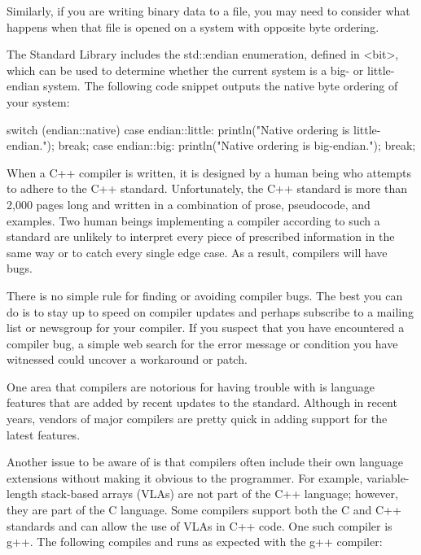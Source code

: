 Similarly, if you are writing binary data to a file, you may need to consider what happens when that file is opened on a system with opposite byte ordering.

The Standard Library includes the std::endian enumeration, defined in <bit>, which can be used to determine whether the current system is a big- or little-endian system. The following code snippet outputs the native byte ordering of your system:

\begin{cpp}
switch (endian::native)
{
    case endian::little:
        println("Native ordering is little-endian.");
        break;
    case endian::big:
        println("Native ordering is big-endian.");
        break;
}
\end{cpp}


When a C++ compiler is written, it is designed by a human being who attempts to adhere to the C++ standard. Unfortunately, the C++ standard is more than 2,000 pages long and written in a combination of prose, pseudocode, and examples. Two human beings implementing a compiler according to such a standard are unlikely to interpret every piece of prescribed information in the same way or to catch every single edge case. As a result, compilers will have bugs.


There is no simple rule for finding or avoiding compiler bugs. The best you can do is to stay up to speed on compiler updates and perhaps subscribe to a mailing list or newsgroup for your compiler. If you suspect that you have encountered a compiler bug, a simple web search for the error message or condition you have witnessed could uncover a workaround or patch.

One area that compilers are notorious for having trouble with is language features that are added by recent updates to the standard. Although in recent years, vendors of major compilers are pretty quick in adding support for the latest features.

Another issue to be aware of is that compilers often include their own language extensions without making it obvious to the programmer. For example, variable-length stack-based arrays (VLAs) are not part of the C++ language; however, they are part of the C language. Some compilers support both the C and C++ standards and can allow the use of VLAs in C++ code. One such compiler is g++. The following compiles and runs as expected with the g++ compiler:

